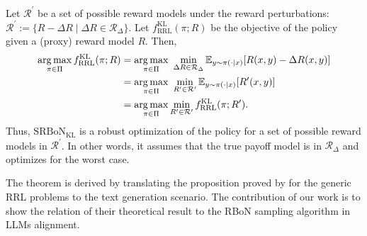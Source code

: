 Let $\mathcal{R}^\prime$ be a set of possible reward models under the reward perturbations: $\mathcal{R}^\prime := \{R - \Delta R \mid \Delta R \in \mathcal{R}_{\Delta}\}$.
Let $f_\mathrm{RRL}^{\mathrm{KL}}(\pi; R)$ be the objective of the policy given a (proxy) reward model $R$. Then,
\begin{align}
\operatorname*{arg\,max}_{\pi \in \Pi} f_\mathrm{RRL}^{\mathrm{KL}}(\pi; R) &= \operatorname*{arg\,max}_{\pi \in \Pi} \,\, \min_{\Delta R \in \mathcal{R}_{\Delta}}\mathbb{E}_{y \sim \pi(\cdot \mid x)}[R(x,y) - \Delta R(x,y)] \nonumber\\
&= \operatorname*{arg\,max}_{\pi \in \Pi} \,\, \min_{R^\prime \in \mathcal{R}^\prime} \mathbb{E}_{y \sim \pi(\cdot \mid x)}[ R^{\prime}(x,y) ] \nonumber\\
&= \operatorname*{arg\,max}_{\pi \in \Pi} \min_{R^\prime \in \mathcal{R}^\prime} f_\mathrm{RRL}^{\mathrm{KL}}(\pi; R^\prime).
\end{align}
Thus, $\mathrm{SRBoN}_{\mathrm{KL}}$ is a robust optimization of the policy for a set of possible reward models in $\mathcal{R}^\prime$. In other words, it assumes that the true payoff model is in $\mathcal{R}_{\Delta}$ and optimizes for the worst case.


The theorem is derived by translating the proposition proved by \citet{brekelmans2022your} for the generic RRL problems to the text generation scenario. 
The contribution of our work is to show the relation of their theoretical result to the RBoN sampling algorithm in LLMs alignment.

